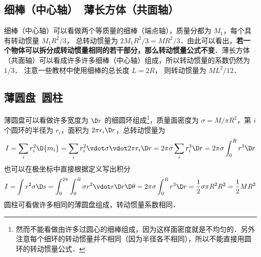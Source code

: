 \subsection{细棒（中心轴）\ 薄长方体（共面轴）}
细棒（中心轴）可以看做两个等质量的细棒（端点轴），质量分都为 $M_1$，每个具有转动惯量 $M_1 R^2/3$， 总转动惯量为 $2M_1 R^2/3=MR^2/3$．由此可以看出，\textbf{若一个物体可以拆分成转动惯量相同的若干部分，那么转动惯量公式不变}．薄长方体（共面轴）可以看成许多许多细棒（中心轴）组成，所以转动惯量的系数仍然为 $1/3$． 注意一些教材中使用细棒的总长度 $L=2R$， 则转动惯量为 $ML^2/12$．

\subsection{薄圆盘\ 圆柱}
薄圆盘可以看做许多宽度为 $\D r$ 的细圆环组成\footnote{然而不能看做由许多过圆心的细棒组成，因为这样面密度就是不均匀的．另外注意每个细环的转动惯量并不相同（因为半径各不相同），所以不能直接用圆环的转动惯量公式．}，质量面密度为 $\sigma  = M/\pi {R^2}$，第 $i$ 个圆环的半径为 $r_i$，面积为 $2\pi r_i\D r$，总转动惯量为
\begin{equation}
I = \sum\limits_i {r_i^2\D{m_i}}  = \sum\limits_i {r_i^2 \vdot \sigma  \vdot 2\pi {r_i}\D r}  = 2\pi \sigma \sum\limits_i {r_i^3\D r}  = 2\pi \sigma \int_0^R {{r^3}\D r}
\end{equation}
也可以在极坐标中直接根据定义写出积分
\begin{equation}
I = \int {{r^2}\sigma \D s}  = \int_0^{2\pi } {\int_0^R {\sigma {r^2} \vdot r\D r\D\theta } }  = 2\pi \sigma \int_0^R {{r^3}\D r}  = \frac{1}{2}\sigma \pi {R^2}{R^2} = \frac{1}{2}M{R^2}
\end{equation}
圆柱可看做许多相同的薄圆盘组成，转动惯量系数相同．

